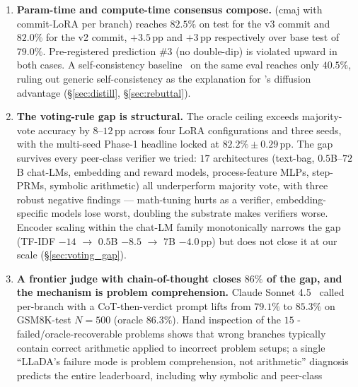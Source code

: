 \begin{enumerate}
          commit) adds $+0.0$\,pp.  The two design errors mask each
          other (\S\ref{sec:distill}).
    \item \textbf{Param-time and compute-time consensus compose.}
          \cmajc{} (cmaj with commit-LoRA per branch) reaches
          $82.5\%$ on test for the v3 commit and $82.0\%$ for the
          v2 commit, $+3.5$\,pp and $+3$\,pp respectively over
          base test \cmaj{} of $79.0\%$.  Pre-registered
          prediction \#3 (no double-dip) is violated upward in
          both cases.  A  self-consistency
          baseline~\citep{wang2023selfconsistency} on the same eval
          reaches only $40.5\%$, ruling out generic self-consistency
          as the explanation for \LLaDA{}'s diffusion \cmaj{}
          advantage (\S\ref{sec:distill}, \S\ref{sec:rebuttal}).
    \item \textbf{The \cmaj{} voting-rule gap is structural.}
          The oracle ceiling exceeds majority-vote accuracy by
          $8\text{--}12$\,pp across four LoRA configurations and
          three seeds, with the multi-seed Phase-1 \cmajc{}
          headline locked at $82.2\% \pm 0.29$\,pp.  The gap
          survives every peer-class verifier we tried: $17$
          architectures (text-bag, $0.5$B--$72$B chat-LMs,
          embedding and reward models, process-feature MLPs,
          step-PRMs, symbolic arithmetic) all underperform
          majority vote, with three robust negative findings ---
          math-tuning hurts as a verifier, embedding-specific
          models lose worst, doubling the substrate makes
          verifiers worse.  Encoder scaling within the chat-LM
          family monotonically narrows the gap
          (TF-IDF $-14$ $\to$ $0.5$B $-8.5$ $\to$ $7$B $-4.0$\,pp)
          but does not close it at our scale
          (\S\ref{sec:voting_gap}).
    \item \textbf{A frontier judge with chain-of-thought closes
          $86\%$ of the gap, and the mechanism is problem
          comprehension.}  Claude Sonnet 4.5~\citep{anthropic2025sonnet}
          called per-branch with a CoT-then-verdict prompt lifts
          \cmaj{} from $79.1\%$ to $85.3\%$ on GSM8K-test
          $N{=}500$ (oracle $86.3\%$).  Hand inspection of the
          $15$ \cmaj{}-failed/oracle-recoverable problems shows
          that wrong branches typically contain correct
          arithmetic applied to incorrect problem setups; a
          single ``LLaDA's failure mode is problem comprehension,
          not arithmetic'' diagnosis predicts the entire
          leaderboard, including why symbolic and peer-class

\end{enumerate}
